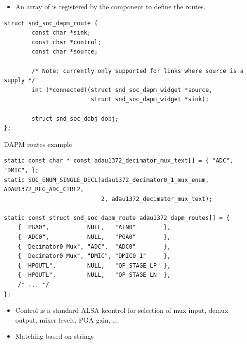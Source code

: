 \begin{frame}[fragile]{}
  \begin{itemize}
  \item An array of  is registered
    by the component to define the routes.
  \end{itemize}
  \begin{block}{}
    \fontsize{9}{9}\selectfont
    \begin{verbatim}
struct snd_soc_dapm_route {
        const char *sink;
        const char *control;
        const char *source;

        /* Note: currently only supported for links where source is a supply */
        int (*connected)(struct snd_soc_dapm_widget *source,
                         struct snd_soc_dapm_widget *sink);

        struct snd_soc_dobj dobj;
};
    \end{verbatim}
  \end{block}
\end{frame}

\begin{frame}[fragile]{DAPM routes example}
  \begin{block}{}
    \fontsize{9}{9}\selectfont
    \begin{verbatim}
static const char * const adau1372_decimator_mux_text[] = { "ADC", "DMIC", };
static SOC_ENUM_SINGLE_DECL(adau1372_decimator0_1_mux_enum, ADAU1372_REG_ADC_CTRL2,
                            2, adau1372_decimator_mux_text);

static const struct snd_soc_dapm_route adau1372_dapm_routes[] = {
    { "PGA0",           NULL,   "AIN0"        },
    { "ADC0",           NULL,   "PGA0"        },
    { "Decimator0 Mux", "ADC",  "ADC0"        },
    { "Decimator0 Mux", "DMIC", "DMIC0_1"     },
    { "HPOUTL",         NULL,   "OP_STAGE_LP" },
    { "HPOUTL",         NULL,   "OP_STAGE_LN" },
    /* ... */
};
    \end{verbatim}
  \end{block}
  \begin{itemize}
  \item Control is a standard ALSA kcontrol for selection of mux input,
    demux output, mixer levels, PGA gain, \dots
  \item Matching based on strings
  \end{itemize}
\end{frame}

